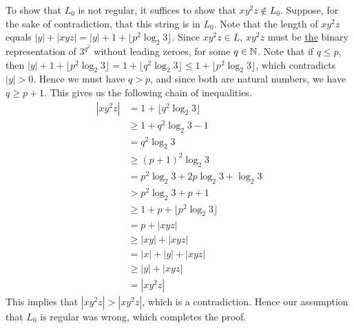 \begin{soln}
    To show that $L_0$ is not regular, it suffices to show that $xy^2z \not\in L_0$. Suppose, for the sake of contradiction, that this string is in $L_0$.\nl
    Note that the length of $xy^2z$ equals $|y| + |xyz| = |y| + 1 + \lfloor p^2 \log_2 3 \rfloor$. Since $xy^2z \in L$, $xy^2z$ must be \underline{the} binary representation of
    $3^{q^2}$ without leading zeroes, for some $q \in \mathbb{N}$.\nl
    Note that if $q \le p$, then $|y| + 1 + \lfloor p^2 \log_2 3 \rfloor = 1 + \lfloor q^2 \log_2 3 \rfloor \le 1 + \lfloor p^2 \log_2 3\rfloor$, which contradicts $|y| > 0$. Hence we must have $q >
    p$, and since both are natural numbers, we have $q \ge p + 1$. This gives us the following chain of inequalities.
    \begin{align*}
        |xy^2z| &= 1 + \lfloor q^2 \log_2 3 \rfloor\\
                &\ge 1 + q^2 \log_2 3 - 1\\
                &= q^2 \log_2 3\\
                &\ge (p + 1)^2 \log_2 3\\
                &= p^2 \log_2 3 + 2p \log_2 3 + \log_2 3\\
                &> p^2 \log_2 3 + p + 1\\
                &\ge 1 + p + \lfloor p^2 \log_2 3 \rfloor\\
                &= p + |xyz|\\
                &\ge |xy| + |xyz|\\
                &= |x| + |y| + |xyz|\\
                &\ge |y| + |xyz|\\
                &= |xy^2z|
    \end{align*}
    This implies that $|xy^2z| > |xy^2z|$, which is a contradiction.\nl
    Hence our assumption that $L_0$ is regular was wrong, which completes the proof.
\end{soln}
